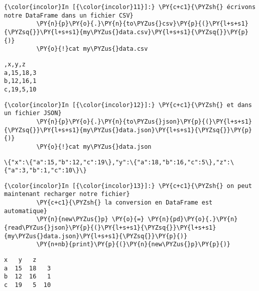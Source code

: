     \begin{Verbatim}[commandchars=\\\{\},frame=single,framerule=0.3mm,rulecolor=\color{cellframecolor}]
{\color{incolor}In [{\color{incolor}11}]:} \PY{c+c1}{\PYZsh{} écrivons notre DataFrame dans un fichier CSV}
         \PY{n}{p}\PY{o}{.}\PY{n}{to\PYZus{}csv}\PY{p}{(}\PY{l+s+s1}{\PYZsq{}}\PY{l+s+s1}{my\PYZus{}data.csv}\PY{l+s+s1}{\PYZsq{}}\PY{p}{)}
         \PY{o}{!}cat my\PYZus{}data.csv
\end{Verbatim}


    \begin{Verbatim}[commandchars=\\\{\},frame=single,framerule=0.3mm,rulecolor=\color{cellframecolor}]
,x,y,z
a,15,18,3
b,12,16,1
c,19,5,10
\end{Verbatim}

    \begin{Verbatim}[commandchars=\\\{\},frame=single,framerule=0.3mm,rulecolor=\color{cellframecolor}]
{\color{incolor}In [{\color{incolor}12}]:} \PY{c+c1}{\PYZsh{} et dans un fichier JSON}
         \PY{n}{p}\PY{o}{.}\PY{n}{to\PYZus{}json}\PY{p}{(}\PY{l+s+s1}{\PYZsq{}}\PY{l+s+s1}{my\PYZus{}data.json}\PY{l+s+s1}{\PYZsq{}}\PY{p}{)}
         \PY{o}{!}cat my\PYZus{}data.json
\end{Verbatim}


    \begin{Verbatim}[commandchars=\\\{\},frame=single,framerule=0.3mm,rulecolor=\color{cellframecolor}]
\{"x":\{"a":15,"b":12,"c":19\},"y":\{"a":18,"b":16,"c":5\},"z":\{"a":3,"b":1,"c":10\}\}
\end{Verbatim}

    \begin{Verbatim}[commandchars=\\\{\},frame=single,framerule=0.3mm,rulecolor=\color{cellframecolor}]
{\color{incolor}In [{\color{incolor}13}]:} \PY{c+c1}{\PYZsh{} on peut maintenant recharger notre fichier}
         \PY{c+c1}{\PYZsh{} la conversion en DataFrame est automatique}
         \PY{n}{new\PYZus{}p} \PY{o}{=} \PY{n}{pd}\PY{o}{.}\PY{n}{read\PYZus{}json}\PY{p}{(}\PY{l+s+s1}{\PYZsq{}}\PY{l+s+s1}{my\PYZus{}data.json}\PY{l+s+s1}{\PYZsq{}}\PY{p}{)}
         \PY{n+nb}{print}\PY{p}{(}\PY{n}{new\PYZus{}p}\PY{p}{)}
\end{Verbatim}


    \begin{Verbatim}[commandchars=\\\{\},frame=single,framerule=0.3mm,rulecolor=\color{cellframecolor}]
    x   y   z
a  15  18   3
b  12  16   1
c  19   5  10
\end{Verbatim}

